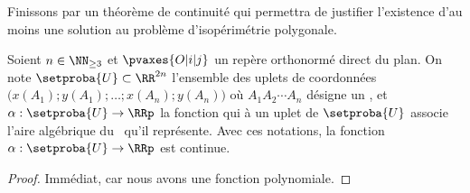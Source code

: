 

Finissons par un théorème de continuité qui permettra de justifier l'existence d'au moins une solution au problème d'isopérimétrie polygonale.


\begin{fact} \label{sarea-cont}
    Soient $n \in \NN_{\geq3}$ et
    $\pvaxes{O | i | j}$ un repère orthonormé direct du plan. 
    On note $\setproba{U} \subset \RR^{2n}$ l'ensemble des uplets de coordonnées $\big( x(A_1) ; y(A_1) ; \dots ; x(A_n) ; y(A_n) \big)$ où $A_1 A_2 \cdots A_n$ désigne un \ncycle,
    et $\alpha: \setproba{U} \rightarrow \RRp$ la fonction qui à un uplet de $\setproba{U}$ associe l'aire algébrique du \ncycle\ qu'il représente.
	Avec ces notations, la fonction $\alpha: \setproba{U} \rightarrow \RRp$ est continue.
\end{fact}


\begin{proof}
	Immédiat, car nous avons une fonction polynomiale.
\end{proof}
